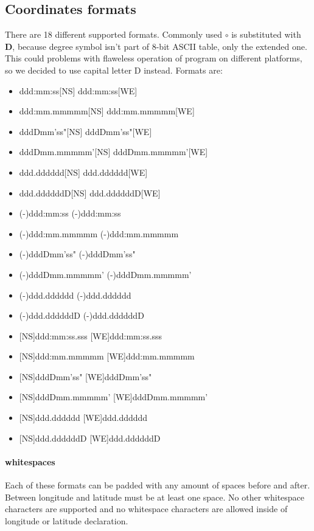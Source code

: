 \documentclass[12pt,titlepage]{article}
\begin{document}
\subsection{Coordinates formats}
There are 18 different supported formats. Commonly used $\circ$ is substituted with \textbf{D}, 
because degree symbol isn't part of 8-bit ASCII table, only the extended one. This could problems
with flaweless operation of program on different platforms, so we decided to use capital letter D 
instead.
Formats are:
\begin{itemize}
\item{ddd:mm:ss[NS] ddd:mm:ss[WE] }
\item{ddd:mm.mmmmm[NS] ddd:mm.mmmmm[WE]}
\item{dddDmm'ss"[NS] dddDmm'ss"[WE]}
\item{dddDmm.mmmmm'[NS] dddDmm.mmmmm'[WE]}
\item{ddd.dddddd[NS] ddd.dddddd[WE]}
\item{ddd.ddddddD[NS] ddd.ddddddD[WE]}

\item{(-)ddd:mm:ss (-)ddd:mm:ss}
\item{(-)ddd:mm.mmmmm (-)ddd:mm.mmmmm}
\item{(-)dddDmm'ss" (-)dddDmm'ss"}
\item{(-)dddDmm.mmmmm' (-)dddDmm.mmmmm'}
\item{(-)ddd.dddddd (-)ddd.dddddd}
\item{(-)ddd.ddddddD (-)ddd.ddddddD}

\item{[NS]ddd:mm:ss.sss [WE]ddd:mm:ss.sss}
\item{[NS]ddd:mm.mmmmm [WE]ddd:mm.mmmmm}
\item{[NS]dddDmm'ss" [WE]dddDmm'ss"}
\item{[NS]dddDmm.mmmmm' [WE]dddDmm.mmmmm'}
\item{[NS]ddd.dddddd [WE]ddd.dddddd}
\item{[NS]ddd.ddddddD [WE]ddd.ddddddD}
\end{itemize}

\paragraph{whitespaces}
Each of these formats can be padded with any amount of spaces before and after.  
Between longitude and latitude must be at least one space. No other whitespace characters are 
supported and no whitespace characters are allowed inside of longitude or latitude declaration.
\end{document}
